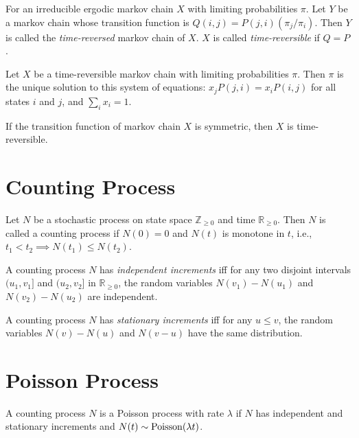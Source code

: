 \documentclass[a4paper, 12pt, fleqn]{article}
\begin{document}
\begin{definition}
For an irreducible ergodic markov chain $X$ with limiting probabilities $\pi$.
Let $Y$ be a markov chain whose transition function is $Q(i, j) = P(j, i)(\pi_j/\pi_i)$.
Then $Y$ is called the \emph{time-reversed} markov chain of $X$.
$X$ is called \emph{time-reversible} if $Q = P$.
\end{definition}

\begin{theorem}
Let $X$ be a time-reversible markov chain with limiting probabilities $\pi$.
Then $\pi$ is the unique solution to this system of equations:
$x_jP(j, i) = x_iP(i, j)$ for all states $i$ and $j$, and $\sum_i x_i = 1$.
\end{theorem}

\begin{theorem}
If the transition function of markov chain $X$ is symmetric, then $X$ is time-reversible.
\end{theorem}

\section{Counting Process}

\begin{definition}
Let $N$ be a stochastic process on state space $\mathbb{Z}_{\ge 0}$ and time $\mathbb{R}_{\ge 0}$.
Then $N$ is called a counting process if $N(0) = 0$ and $N(t)$ is monotone in $t$,
i.e., $t_1 < t_2 \implies N(t_1) \le N(t_2)$.
\end{definition}

\begin{definition}
A counting process $N$ has \emph{independent increments} iff
for any two disjoint intervals $(u_1, v_1]$ and $(u_2, v_2]$ in $\mathbb{R}_{\ge 0}$,
the random variables $N(v_1) - N(u_1)$ and $N(v_2) - N(u_2)$ are independent.
\end{definition}

\begin{definition}
A counting process $N$ has \emph{stationary increments} iff for any $u \le v$,
the random variables $N(v) - N(u)$ and $N(v-u)$ have the same distribution.
\end{definition}

\section{Poisson Process}

\begin{definition}
A counting process $N$ is a Poisson process with rate $\lambda$ if
$N$ has independent and stationary increments and $N(t) \sim \operatorname{Poisson}(\lambda t)$.
\end{definition}
\end{document}
